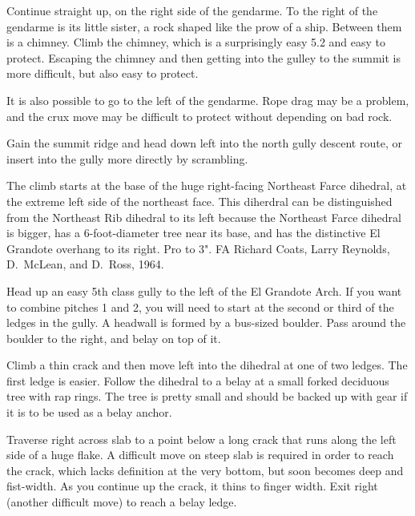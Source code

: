 \documentclass{tahquitz}
\begin{document}
 Continue straight up, on the right side of the gendarme.  To
the right of the gendarme is its little sister, a rock shaped like the
prow of a ship. Between them is a chimney. Climb the chimney, which is
a surprisingly easy 5.2 and easy to protect. Escaping the chimney and
then getting into the gulley to the summit is more difficult, but also
easy to protect.

 It is also possible to go to the left of the gendarme.
Rope drag may be a problem, and the crux move may be difficult to protect
without depending on bad rock.

Gain the summit ridge and head down left into the north gully descent route,
or insert into the gully more directly by scrambling.





The climb starts at the base of the huge right-facing Northeast Farce dihedral,
at the extreme left side of the northeast face.
This diherdral can be distinguished from the Northeast Rib dihedral to its left
because the Northeast Farce dihedral is bigger, has a 6-foot-diameter tree near its base,
and has the distinctive El Grandote overhang to its right.
Pro to 3". FA Richard Coats, Larry Reynolds, D.~McLean, and D.~Ross, 1964.

 Head up an easy 5th class gully to the left of the El Grandote Arch.
If you want to combine pitches 1 and 2, you will need to start at the second or third
of the ledges in the gully. A headwall is formed by a bus-sized boulder. Pass around the boulder
to the right, and belay on top of it.

 Climb a thin crack and then move left into the dihedral at one of two ledges.
The first ledge is easier. Follow the dihedral to a belay at a small forked deciduous tree with rap
rings. The tree is pretty small and should be backed up with gear if it is to be
used as a belay anchor.

 Traverse right across slab to a point below a long crack that runs
along the left side of a huge flake. A difficult move on steep slab is required in
order to reach the crack, which lacks definition at the very bottom, but soon becomes
deep and fist-width. As you continue up the crack, it thins to finger width.
Exit right (another difficult move) to reach a belay ledge.
\end{document}
